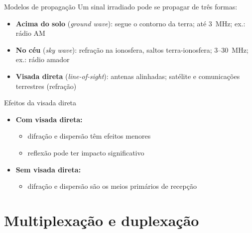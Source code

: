\documentclass[aspectratio=169,11pt]{beamer}
\begin{document}
\begin{frame}{Modelos de propagação}
  Um sinal irradiado pode se propagar de três formas:
  \begin{center}
  \end{center}
  \begin{itemize}
    \item \textbf{Acima do solo} (\emph{ground wave}): segue o contorno da terra; até 3~MHz; ex.: rádio AM
    \item \textbf{No céu} (\emph{sky wave}): refração na ionosfera, saltos terra-ionosfera; 3--30~MHz; ex.: rádio amador
    \item \textbf{Visada direta} (\emph{line-of-sight}): antenas alinhadas; satélite e comunicações terrestres (refração)
  \end{itemize}
\end{frame}

\begin{frame}{Efeitos da visada direta}
  \begin{itemize}
    \item \textbf{Com visada direta:}
      \begin{itemize}
        \item difração e dispersão têm efeitos menores
        \item reflexão pode ter impacto significativo
      \end{itemize}
    \item \textbf{Sem visada direta:}
      \begin{itemize}
        \item difração e dispersão são os meios primários de recepção
      \end{itemize}
  \end{itemize}
\end{frame}

\section{Multiplexação e duplexação}
\end{document}
